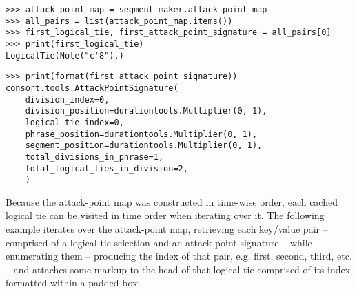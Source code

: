 \begin{comment}
<abjad>[stylesheet=../consort.ily]
attack_point_map = segment_maker.attack_point_map
all_pairs = list(attack_point_map.items())
first_logical_tie, first_attack_point_signature = all_pairs[0]
print(first_logical_tie)
print(format(first_attack_point_signature))
</abjad>
\end{comment}

\begin{abjadbookoutput}
\begin{singlespacing}
\vspace{-0.5\baselineskip}
\begin{verbatim}
>>> attack_point_map = segment_maker.attack_point_map
>>> all_pairs = list(attack_point_map.items())
>>> first_logical_tie, first_attack_point_signature = all_pairs[0]
>>> print(first_logical_tie)
LogicalTie(Note("c'8"),)
\end{verbatim}
\begin{verbatim}
>>> print(format(first_attack_point_signature))
consort.tools.AttackPointSignature(
    division_index=0,
    division_position=durationtools.Multiplier(0, 1),
    logical_tie_index=0,
    phrase_position=durationtools.Multiplier(0, 1),
    segment_position=durationtools.Multiplier(0, 1),
    total_divisions_in_phrase=1,
    total_logical_ties_in_division=2,
    )
\end{verbatim}
\end{singlespacing}
\end{abjadbookoutput}

\noindent Because the attack-point map was constructed in time-wise order, each
cached logical tie can be visited in time order when iterating over it. The
following example iterates over the attack-point map, retrieving each key/value
pair -- comprised of a logical-tie selection and an attack-point signature --
while enumerating them -- producing the index of that pair, e.g. first, second,
third, etc. -- and attaches some markup to the head of that logical tie
comprised of its index formatted within a padded box:

\begin{comment}
<abjad>[stylesheet=../consort.ily]
for index, key_value_pair in enumerate(attack_point_map.items()):
    logical_tie, attack_point_signature = key_value_pair
    markup = Markup(index, Up)
    markup = markup.smaller().pad_around(0.25).box()
    attach(markup, logical_tie.head)

show(illustration)
</abjad>
\end{comment}

